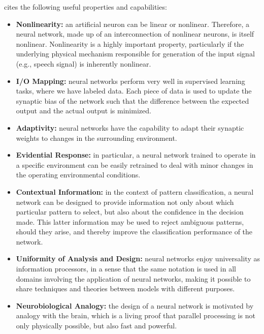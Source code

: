 \cite{haykin2009neural} cites the following useful properties and capabilities:
\begin{itemize}
    \item \textbf{Nonlinearity:} an artificial neuron can be linear or nonlinear. Therefore, a neural network, made up of an interconnection of nonlinear neurons, is itself nonlinear. Nonlinearity is a highly important property, particularly if the underlying physical mechanism responsible for generation of the input signal (e.g., speech signal) is inherently nonlinear.
    \item \textbf{I/O Mapping:} neural networks perform very well in supervised learning tasks, where we have labeled data. Each piece of data is used to update the synaptic bias of the network such that the difference between the expected output and the actual output is minimized.
    \item \textbf{Adaptivity:} neural networks have the capability to adapt their synaptic weights to changes in the surrounding environment. 
    \item \textbf{Evidential Response:} in particular, a neural network trained to operate in a specific environment can be easily retrained to deal with minor changes in the operating environmental conditions.
    \item \textbf{Contextual Information:} in the context of pattern classification, a neural network can be designed to provide information not only about which particular pattern to select, but also about the confidence in the decision made. This latter information may be used to reject ambiguous patterns, should they arise, and thereby improve the classification performance of the network.
    \item \textbf{Uniformity of Analysis and Design:} neural networks enjoy universality as information processors, in a sense that the same notation is used in all domains involving the application of neural networks, making it possible to share techniques and theories between models with different purposes.
    \item \textbf{Neurobiological Analogy:} the design of a neural network is motivated by analogy with the brain, which is a living proof that parallel processing is not only physically possible, but also fast and powerful.
\end{itemize}

